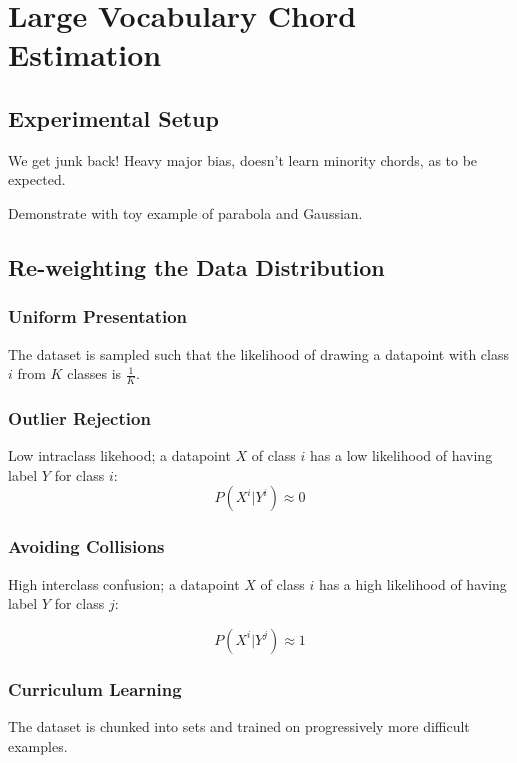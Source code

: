 \section{Large Vocabulary Chord Estimation}



\subsection{Experimental Setup}



We get junk back! Heavy major bias, doesn't learn minority chords, as to be expected.

Demonstrate with toy example of parabola and Gaussian.

\subsection{Re-weighting the Data Distribution}

\subsubsection{Uniform Presentation}
The dataset is sampled such that the likelihood of drawing a datapoint with class $i$ from $K$ classes is $\frac{1}{K}$.

\subsubsection{Outlier Rejection}
Low intraclass likehood; a datapoint $X$ of class $i$ has a low likelihood of having label $Y$ for class $i$:
\begin{equation}
P(X^i | Y^i) \approx 0
\label{eq:outliers}
\end{equation}


\subsubsection{Avoiding Collisions}

High interclass confusion; a datapoint $X$ of class $i$ has a high likelihood of having label $Y$ for class $j$:

\begin{equation}
P(X^i | Y^j) \approx 1
\label{eq:collisions}
\end{equation}

\subsubsection{Curriculum Learning}
The dataset is chunked into sets and trained on progressively more difficult examples.

